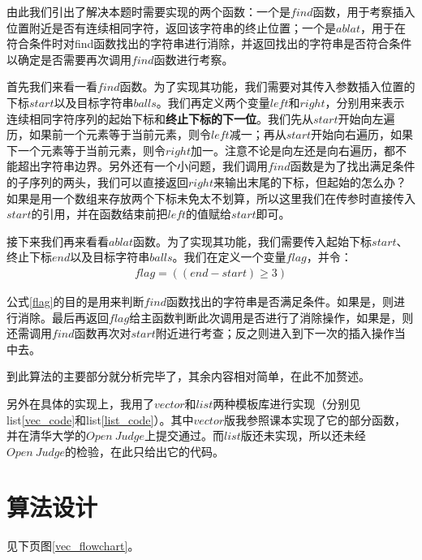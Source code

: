 \documentclass[UTF8]{ctexart}
\begin{document}
	\indent 由此我们引出了解决本题时需要实现的两个函数：一个是$find$函数，用于考察插入位置附近是否有连续相同字符，返回该字符串的终止位置；一个是$ablat$，用于在符合条件时对find函数找出的字符串进行消除，并返回找出的字符串是否符合条件以确定是否需要再次调用$find$函数进行考察。
	
	\indent 首先我们来看一看$find$函数。为了实现其功能，我们需要对其传入参数插入位置的下标$start$以及目标字符串$balls$。我们再定义两个变量$left$和$right$，分别用来表示连续相同字符序列的起始下标和\textbf{终止下标的下一位}。我们先从$start$开始向左遍历，如果前一个元素等于当前元素，则令$left$减一；再从$start$开始向右遍历，如果下一个元素等于当前元素，则令$right$加一。注意不论是向左还是向右遍历，都不能超出字符串边界。另外还有一个小问题，我们调用$find$函数是为了找出满足条件的子序列的两头，我们可以直接返回$right$来输出末尾的下标，但起始的怎么办？如果是用一个数组来存放两个下标未免太不划算，所以这里我们在传参时直接传入$start$的引用，并在函数结束前把$left$的值赋给$start$即可。
	
	\indent 接下来我们再来看看$ablat$函数。为了实现其功能，我们需要传入起始下标$start$、终止下标$end$以及目标字符串$balls$。我们在定义一个变量$flag$，并令：
	\begin{align}
	flag = ((end - start) \geq 3) \label{flag}
	\end{align}
	
	\indent 公式\ref{flag}的目的是用来判断$find$函数找出的字符串是否满足条件。如果是，则进行消除。最后再返回$flag$给主函数判断此次调用是否进行了消除操作，如果是，则还需调用$find$函数再次对$start$附近进行考查；反之则进入到下一次的插入操作当中去。
	
	\indent 到此算法的主要部分就分析完毕了，其余内容相对简单，在此不加赘述。
	
	\indent 另外在具体的实现上，我用了$vector$和$list$两种模板库进行实现（分别见list\ref{vec_code}和list\ref{list_code}）。其中$vector$版我参照课本\cite{data_structure}实现了它的部分函数，并在清华大学的$Open\ Judge$上提交通过。而$list$版还未实现，所以还未经$Open\ Judge$的检验，在此只给出它的代码。
	\section{算法设计}
	见下页图\ref{vec_flowchart}。
\end{document}
